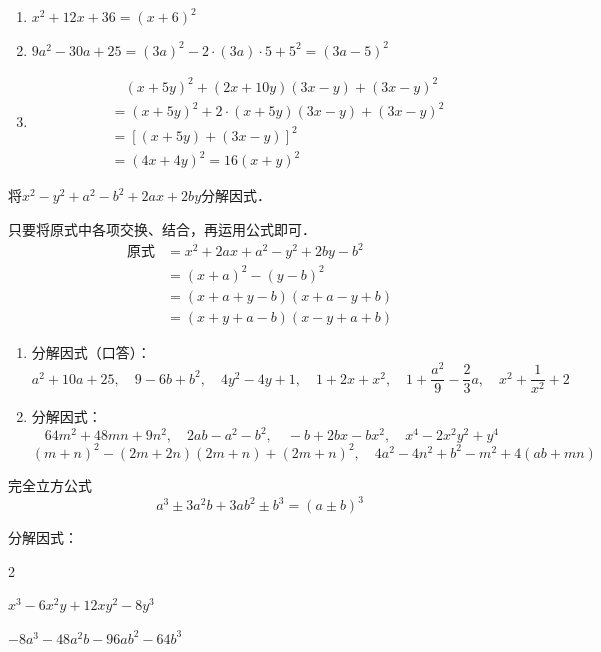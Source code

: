 \begin{solution}
    \begin{enumerate}
        \item $x^2+12x+36=(x+6)^2$
        \item $9a^2-30a+25=(3a)^2-2\cdot (3a)\cdot 5+5^2=(3a-5)^2$
        \item \[\begin{split}
           &\quad  (x+5y)^2+(2x+10y)(3x-y)+(3x-y)^2\\
           &=(x+5y)^2+2\cdot (x+5y)(3x-y) +(3x-y) ^2\\
           &=[(x+5y) +(3x-y) ]^2\\
           &=(4x+4y)^2=16(x+y)^2          
        \end{split}\]
    \end{enumerate}
\end{solution}


\begin{example}
将$x^2-y^2+a^2-b^2+2ax+2by$分解因式．
\end{example}


\begin{solution}
    只要将原式中各项交换、结合，再运用公式即可．
\[\begin{split}
  \text{原式}&=x^2+2ax+a^2-y^2+2by-b^2\\
  &=(x+a)^2-(y-b)^2\\
  &=(x+a+y-b)(x+a-y+b)\\
  &=(x+y+a-b)(x-y+a+b)  
\end{split}\]
\end{solution}

\begin{ex}
\begin{enumerate}
    \item 分解因式（口答）：
    \[a^2+10a+25,\quad 9-6b+b^2,\quad 4y^2-4y+1,\quad 1+2x+x^2,\quad 1+\frac{a^2}{9}-\frac{2}{3}a,\quad x^2+\frac{1}{x^2}+2\] 
    \item 分解因式：
     \[64m^2+48mn+9n^2,\quad 2ab-a^2-b^2,\quad -b+2bx-bx^2,\quad x^4-2x^2y^2+y^4\] 
     \[(m+n)^2-(2m+2n)(2m+n)+(2m+n)^2,\quad4a^2-4n^2+b^2-m^2+4(ab+mn) \]
\end{enumerate}
\end{ex}

\begin{blk}{完全立方公式}
\[a^3\pm 3a^2b+3ab^2\pm b^3=(a\pm b)^3\]
\end{blk}

\begin{example}
    分解因式：
    \begin{enumerate}
        \begin{multicols}{2}
        \item $x^3-6x^2y+12xy^2-8y^3$
        \item $-8a^3-48a^2b-96ab^2-64b^3$
        \end{multicols}
    \end{enumerate}
\end{example}

